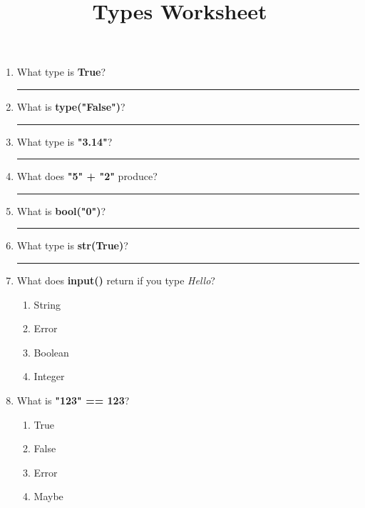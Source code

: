 \documentclass{article}
\title{\vspace{-3em}Types Worksheet\vspace{-2em}}
\begin{document}
\maketitle

\begin{multicols*}{4}
    \raggedright
    \begin{enumerate}
        \item \noindent What type is \textbf{True}?  \vspace{3mm}\\
        \rule{\linewidth}{0.4pt} %

        \item \noindent What is \textbf{type("False")}?

        \rule{\linewidth}{0.4pt} %

        \item What type is \textbf{"3.14"}?
        \rule{\linewidth}{0.4pt} %

        \item What does \textbf{"5" + "2"} produce?
        \rule{\linewidth}{0.4pt} %

        \item What is \textbf{bool("0")}?
        \rule{\linewidth}{0.4pt} %

        \item What type is \textbf{str(True)}?
        \rule{\linewidth}{0.4pt} %

        \item What does \textbf{input()} return if you type \textit{Hello}?
        \begin{enumerate}[label=(\Alph*)]
            \item String
            \item Error
            \item Boolean
            \item Integer
        \end{enumerate}

        \item What is \textbf{"123" == 123}?
        \begin{enumerate}[label=(\Alph*)]
            \item True
            \item False
            \item Error
            \item Maybe
        \end{enumerate}


\end{enumerate}
\end{multicols*}
\end{document}
